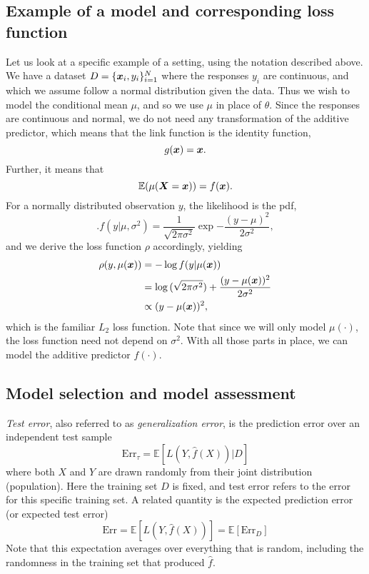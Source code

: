 \subsection{Example of a model and corresponding loss function}
Let us look at a specific example of a setting, using the notation described above. We have a dataset $D=\{\bm{x}_i,y_i\}_{i=1}^N$ where the responses $y_i$ are continuous, and which we assume follow a normal distribution given the data. Thus we wish to model the conditional mean $\mu$, and so we use $\mu$ in place of $\theta$. Since the responses are continuous and normal, we do not need any transformation of the additive predictor, which means that the link function is the identity function,
\begin{equation}
    g(\bm{x})=\bm{x}.
\end{equation}
Further, it means that
\begin{equation}
    \mathbb{E}(\mu(\bm{X}=\bm{x}))=f(\bm{x}).
\end{equation}
For a normally distributed observation $y$, the likelihood is the pdf,
\begin{equation}
    .f(y|\mu,\sigma^2)=\frac{1}{\sqrt{2\pi\sigma^2}}\exp{-\frac{(y-\mu)^2}{2\sigma^2}},
\end{equation}
and we derive the loss function $\rho$ accordingly, yielding
\begin{align*}
    \rho(y,\mu(\bm{x}))&=-\log{f(y|\mu(\bm{x}))}\\
    &=\log{(\sqrt{2\pi\sigma^2})}+\frac{(y-\mu(\bm{x}))^2}{2\sigma^2} \\
    &\propto(y-\mu(\bm{x}))^2,
\end{align*}
which is the familiar $L_2$ loss function. Note that since we will only model $\mu(\cdot)$, the loss function need not depend on $\sigma^2$. With all those parts in place, we can model the additive predictor $f(\cdot)$.

\subsection{Model selection and model assessment}
\textit{Test error}, also referred to as \textit{generalization error}, is the prediction error over an independent test sample
\begin{equation}\label{eq:test-error}
    \text{Err}_{\tau}=\mathbb{E}[L(Y,\hat{f}(X))|D]
\end{equation}
where both $X$ and $Y$ are drawn randomly from their joint distribution (population).
Here the training set $D$ is fixed, and test error refers to the error for this specific training set.
A related quantity is the expected prediction error (or expected test error)
\begin{equation}
    \text{Err}=\mathbb{E}[L(Y,\hat{f}(X))]=\mathbb{E}\left[\text{Err}_D\right]
\end{equation}
Note that this expectation averages over everything that is random, including the randomness in the training set that produced $\hat{f}$.

